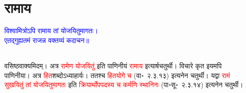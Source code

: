 \section[रामाय]{रामाय}
\centering\textcolor{blue}{विश्वामित्रोऽपि रामाय तां योजयितुमागतः।\nopagebreak\\
एतद्गुह्यतमं राजन्न वक्तव्यं कदाचन॥}\nopagebreak\\
\\
\begin{sloppypar}\justifying\noindent\hspace{10mm} वसिष्ठ\-वाक्यमिदम्। अत्र \textcolor{red}{रामेण योजयितुं} इति पाणिनीयं \textcolor{red}{रामाय} इत्यार्ष\-चतुर्थी। विचारे कृत इयमपि पाणिनीया। अत्र \textcolor{red}{हित}\-शब्दोऽध्याहार्यः। ततश्च \textcolor{red}{हित\-योगे च} (वा॰~२.३.१३) इत्यनेन चतुर्थी। यद्वा \textcolor{red}{रामं सुखयितुं तां योजयितुमागतः} इति \textcolor{red}{क्रियार्थोपपदस्य च कर्मणि स्थानिनः} (पा॰सू॰~२.३.१४) इत्यनेन चतुर्थी।\end{sloppypar}
